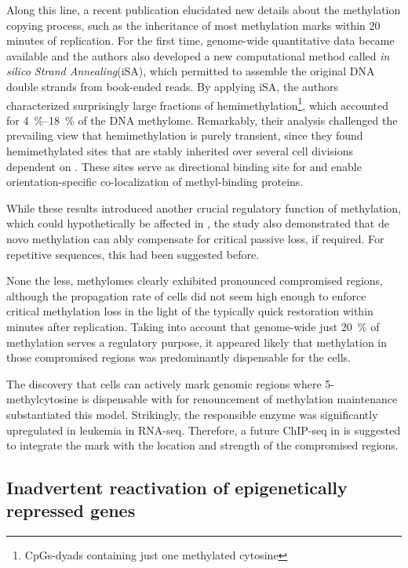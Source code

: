 Along this line, a recent publication elucidated new details about the methylation copying process, such as the inheritance of most methylation marks within 20 minutes of replication\cite{Xu2018b}. For the first time, genome-wide quantitative data became available and the authors also developed a new computational method called \emph{in silico Strand Annealing}(iSA), which permitted to assemble the original DNA double strands from book-ended reads. By applying iSA, the authors characterized surprisingly large fractions of hemimethylation\footnote{CpGs-dyads containing just one methylated cytosine}, which accounted for \SIrange{4}{18}{\percent} of the DNA methylome. Remarkably, their analysis challenged the prevailing view that hemimethylation is purely transient, since they found hemimethylated sites that are stably inherited over several cell divisions dependent on . These sites serve as directional binding site for  and enable orientation-specific co-localization of methyl-binding proteins\cite{Xu2018b}.

While these results introduced another crucial regulatory function of methylation, which could hypothetically be affected in \dnmtchip, the study also demonstrated that de novo methylation can ably compensate for critical passive loss, if required. For repetitive sequences, this had been suggested before\cite{Liang2002}.

None the less, \dnmtchip methylomes clearly exhibited pronounced compromised regions, although the propagation rate of \mllafnine cells did not seem high enough to enforce critical methylation loss in the light of the typically quick restoration within minutes after replication. Taking into account that genome-wide just \SI{20}{\percent} of methylation serves a regulatory purpose\cite{Ziller2013}, it appeared likely that methylation in those compromised regions was predominantly dispensable for the \mllafnine cells. 

The discovery that cells can actively mark genomic regions where 5-methylcytosine is dispensable with \histwoarg for renouncement of methylation maintenance\cite{Veland2017} substantiated this model. Strikingly, the responsible enzyme  was significantly upregulated in \dnmtchip \mllafnine leukemia in RNA-seq. Therefore, a future \histwoarg ChIP-seq in \dnmtchip is suggested to integrate the mark with the location and strength of the compromised regions. 

\subsection{Inadvertent reactivation of epigenetically repressed genes}
\label{chap:d:methylation:shaping:react}

